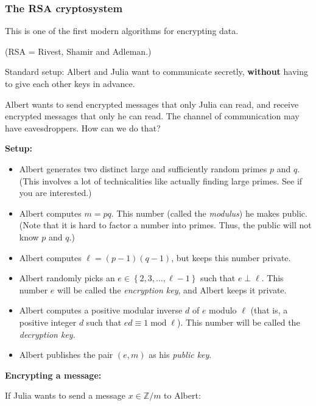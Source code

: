 \documentclass[numbers=enddot,12pt,final,onecolumn,notitlepage]{scrartcl}%
\numberwithin{exer}{subsection}
\theoremstyle{definition}
\begin{document}
\subsubsection{The RSA cryptosystem}

This is one of the first modern algorithms for encrypting data.

(RSA = Rivest, Shamir and Adleman.)

Standard setup: Albert and Julia want to communicate secretly,
\textbf{without} having to give each other keys in advance.

Albert wants to send encrypted messages that only Julia can read, and receive
encrypted messages that only he can read. The channel of communication may
have eavesdroppers. How can we do that?

\textbf{Setup:}

\begin{itemize}
\item Albert generates two distinct large and sufficiently random primes $p$
and $q$. (This involves a lot of technicalities like actually finding large
primes. See \cite{Gallier-RSA} if you are interested.)

\item Albert computes $m=pq$. This number (called the \textit{modulus}) he
makes public. (Note that it is hard to factor a number into primes. Thus, the
public will not know $p$ and $q$.)

\item Albert computes $\ell=\left(  p-1\right)  \left(  q-1\right)  $, but
keeps this number private.

\item Albert randomly picks an $e\in\left\{  2,3,\ldots,\ell-1\right\}  $ such
that $e\perp\ell$. This number $e$ will be called the \textit{encryption key},
and Albert keeps it private.

\item Albert computes a positive modular inverse $d$ of $e$ modulo $\ell$
(that is, a positive integer $d$ such that $ed\equiv1\operatorname{mod}\ell$).
This number will be called the \textit{decryption key}.

\item Albert publishes the pair $\left(  e,m\right)  $ as his \textit{public
key}.
\end{itemize}

\textbf{Encrypting a message:}

If Julia wants to send a message $x\in\mathbb{Z}/m$ to Albert:
\end{document}
